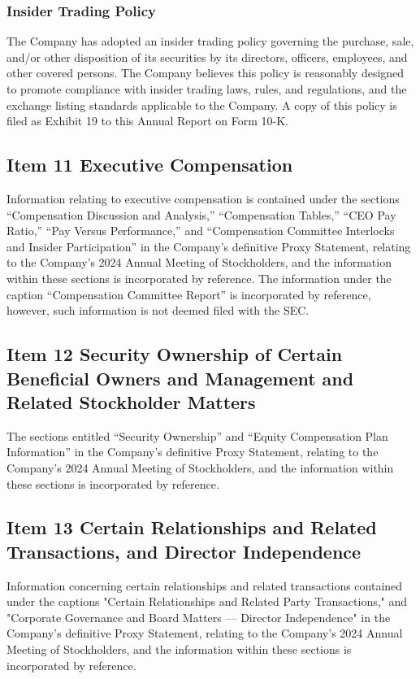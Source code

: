 \subsubsection{Insider Trading Policy}
The Company has adopted an insider trading policy governing the purchase, sale, and/or other disposition of its securities by its directors, officers, employees, and other covered persons. The Company believes this policy is reasonably designed to promote compliance with insider trading laws, rules, and regulations, and the exchange listing standards applicable to the Company. A copy of this policy is filed as Exhibit 19 to this Annual Report on Form 10-K.


\subsection{Item 11 Executive Compensation}
Information relating to executive compensation is contained under the sections “Compensation Discussion and Analysis,” “Compensation Tables,” “CEO Pay Ratio,” “Pay Versus Performance,” and “Compensation Committee Interlocks and Insider Participation” in the Company's definitive Proxy Statement, relating to the Company's 2024 Annual Meeting of Stockholders, and the information within these sections is incorporated by reference. The information under the caption “Compensation Committee Report” is incorporated by reference, however, such information is not deemed filed with the SEC.


\subsection{Item 12 Security Ownership of Certain Beneficial Owners and Management and Related Stockholder Matters}
The sections entitled “Security Ownership” and “Equity Compensation Plan Information” in the Company's definitive Proxy Statement, relating to the Company's 2024 Annual Meeting of Stockholders, and the information within these sections is incorporated by reference.

\subsection{Item 13 Certain Relationships and Related Transactions, and Director Independence}
Information concerning certain relationships and related transactions contained under the captions "Certain Relationships and Related Party Transactions," and "Corporate Governance and Board Matters — Director Independence" in the Company's definitive Proxy Statement, relating to the Company’s 2024 Annual Meeting of Stockholders, and the information within these sections is incorporated by reference.

